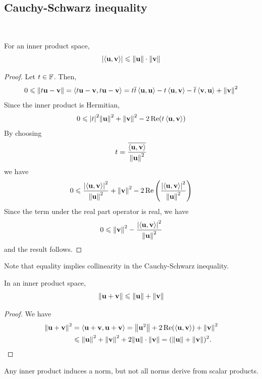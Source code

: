 \documentclass[a4paper]{article}
\begin{document}
\subsection{Cauchy-Schwarz inequality}
\ \vspace*{-1.5em}
\begin{lemma}
	For an inner product space,
	\[
		\abs{\left\langle{{\bf u},{\bf v}}\right\rangle} \leqslant \norm{\mathbf{u}} \cdot \norm{\mathbf{v}}
	\]
\end{lemma}
\begin{proof}
	Let \( t \in {\mathbb{F}} \).
	Then,
	\[
		0 \leqslant \norm{t {\bf u} - {\bf v}} = \left\langle{t{\bf u}- {\bf v}, t{\bf u}- {\bf v}}\right\rangle = t \overline t \left\langle{{\bf u},{\bf u}}\right\rangle - t \left\langle{{\bf u},{\bf v}}\right\rangle - \overline t \left\langle{{\bf v},{\bf u}}\right\rangle + \norm{{\bf v}}^2
	\]
	Since the inner product is Hermitian,
	\[
		0 \leqslant \abs{t}^2 \norm{{\bf u}}^2 + \norm{{\bf v}}^2 - 2 \Re(t \left\langle{{\bf u},{\bf v}}\right\rangle)
	\]
	By choosing
	\[
		t = \frac{\overline{\left\langle{{\bf u},{\bf v}}\right\rangle}}{\norm{{\bf u}}^2}
	\]
	we have
	\[
		0 \leqslant \frac{\abs{\left\langle{{\bf u},{\bf v}}\right\rangle}^2}{\norm{{\bf u}}^2} + \norm{{\bf v}}^2 - 2 \Re\qty(\frac{\abs{\left\langle{{\bf u},{\bf v}}\right\rangle}^2}{\norm{{\bf u}}^2})
	\]
	Since the term under the real part operator is real, we have 
	\[
		0\leqslant \left\| \mathbf{v} \right\|^2 - \frac{\abs{\left\langle{\mathbf{u},\mathbf{v}}\right\rangle}^2}{\left\| \mathbf{u} \right\|^2}
	\]and the result follows.
\end{proof}
\noindent Note that equality implies collinearity in the Cauchy-Schwarz inequality.
\begin{corollary}
	In an inner product space,
	\[
		\norm{{\bf u}+{\bf v}} \leqslant \norm{{\bf u}} + \norm{{\bf v}}
	\]
\end{corollary}
\begin{proof}
	We have
	\begin{align*}
		\norm{{\bf u}+{\bf v}}^2 &= \left\langle{{\bf u}+{\bf v}, {\bf u}+{\bf v}}\right\rangle = \norm{{\bf u}^2} + 2 \Re(\left\langle{{\bf u},{\bf v}}\right\rangle) + \norm{{\bf v}}^2 \\ 
		&\leqslant \norm{{\bf u}}^2 + \norm{{\bf v}}^2 + 2 \norm{{\bf u}} \cdot \norm{{\bf v}} = (\norm{{\bf u}} + \norm{{\bf v}})^2. \qedhere
	\end{align*}
\end{proof}
\begin{remark}
	Any inner product induces a norm, but not all norms derive from scalar products.
\end{remark}
\end{document}
